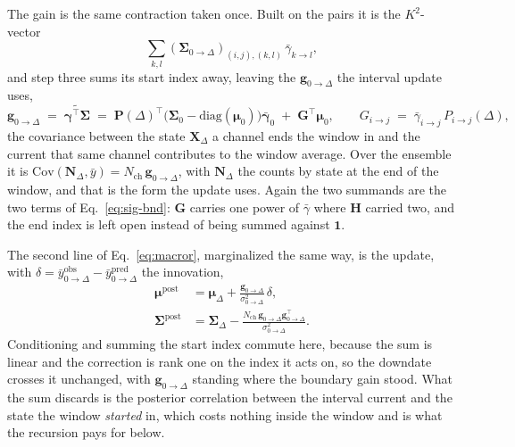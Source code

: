 \begin{appendixbox}
The gain is the same contraction taken once. Built on the pairs it is the $K^2$-vector
\[
  \sum_{k,l}(\boldsymbol{\Sigma}_{0\to\Delta})_{(i,j),(k,l)}\,\bar{\gamma}_{k\to l},
\]
and step three sums its start index away, leaving the
$\mathbf{g}_{0\to\Delta}$ the interval update uses,
\begin{equation}
  \mathbf{g}_{0\to\Delta} \;=\; \widetilde{\boldsymbol{\gamma}^\top\boldsymbol{\Sigma}}
  \;=\; \mathbf{P}(\Delta)^\top\bigl(\boldsymbol{\Sigma}_0-\mathrm{diag}(\boldsymbol{\mu}_0)\bigr)\bar{\boldsymbol{\gamma}}_0
  \;+\; \mathbf{G}^\top\boldsymbol{\mu}_0,
  \qquad
  G_{i\to j} \;=\; \bar{\gamma}_{i\to j}\,P_{i\to j}(\Delta),
  \label{eq:vector-tilde}
\end{equation}
the covariance between the state $\mathbf{X}_\Delta$ a channel ends the window in and the
current that same channel contributes to the window average. Over the ensemble it is
$\mathrm{Cov}(\mathbf{N}_\Delta,\bar{y})=N_{\mathrm{ch}}\,\mathbf{g}_{0\to\Delta}$, with $\mathbf{N}_\Delta$
the counts by state at the end of the window, and that is the form the update uses.
Again the two summands are the two terms of Eq.~\ref{eq:sig-bnd}:
$\mathbf{G}$ carries one power of $\bar{\gamma}$ where $\mathbf{H}$ carried two, and the
end index is left open instead of being summed against $\mathbf{1}$.

The second line of Eq.~\ref{eq:macror}, marginalized the same way, is the update, with
$\delta = \bar{y}^{\mathrm{obs}}_{0\to\Delta} - \bar{y}^{\mathrm{pred}}_{0\to\Delta}$ the innovation,
\begin{align}
  \boldsymbol{\mu}^{\mathrm{post}} &= \boldsymbol{\mu}_\Delta + \frac{\mathbf{g}_{0\to\Delta}}{\sigma^2_{0\to\Delta}}\,\delta, \label{eq:mu-post}\\
  \boldsymbol{\Sigma}^{\mathrm{post}} &= \boldsymbol{\Sigma}_\Delta - \frac{N_{\mathrm{ch}}\,\mathbf{g}_{0\to\Delta}\mathbf{g}_{0\to\Delta}^\top}{\sigma^2_{0\to\Delta}}. \label{eq:sig-post}
\end{align}
Conditioning and summing the start index commute here, because the sum is linear and the
correction is rank one on the index it acts on, so the downdate crosses it unchanged, with
$\mathbf{g}_{0\to\Delta}$ standing where the boundary gain stood. What the sum discards is the posterior correlation
between the interval current and the state the window \emph{started} in, which costs nothing
inside the window and is what the recursion pays for below.


\end{appendixbox}
